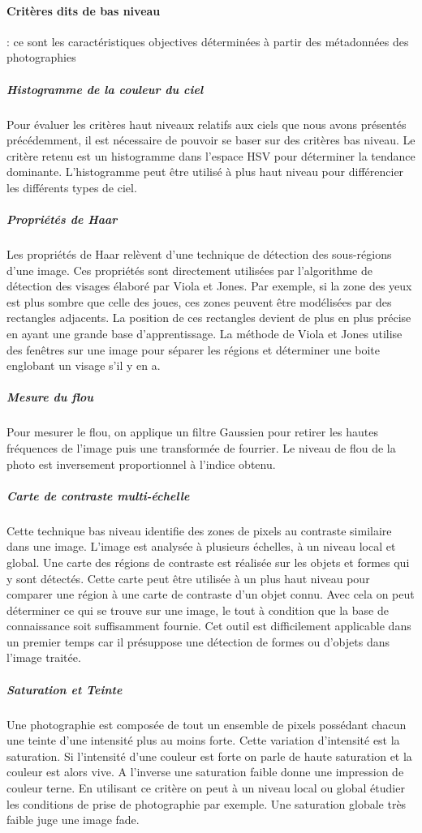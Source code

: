 \documentclass[11pt, french]{report-rd-info}
\begin{document}
\paragraph{Critères dits de bas niveau} : ce sont les caractéristiques objectives déterminées à partir des métadonnées des photographies
\subparagraph{Histogramme de la couleur du ciel}
Pour évaluer les critères haut niveaux relatifs aux ciels que nous avons présentés précédemment, il est nécessaire de pouvoir se baser sur des critères bas niveau. Le critère retenu est un histogramme dans l’espace HSV pour déterminer la tendance dominante. L’histogramme peut être utilisé à plus haut niveau pour différencier les différents types de ciel.
\subparagraph{Propriétés de Haar}
Les propriétés de Haar relèvent d’une technique de détection des sous-régions d’une image. Ces propriétés sont directement utilisées par l’algorithme de détection des visages élaboré par Viola et Jones. Par exemple, si la zone des yeux est plus sombre que celle des joues, ces zones peuvent être modélisées par des rectangles adjacents. La position de ces rectangles devient de plus en plus précise en ayant une grande base d’apprentissage. La méthode de Viola et Jones utilise des fenêtres sur une image pour séparer les régions et déterminer une boite englobant un visage s’il y en a.


\subparagraph{Mesure du flou}
Pour mesurer le flou, on applique un filtre Gaussien pour retirer les hautes fréquences de l’image puis une transformée de fourrier. Le niveau de flou de la photo est inversement proportionnel à l’indice obtenu.


\subparagraph{Carte de contraste multi-échelle}
Cette technique bas niveau identifie des zones de pixels au contraste similaire dans une image. L’image est analysée à plusieurs échelles, à un niveau local et global. Une carte des régions de contraste est réalisée sur les objets et formes qui y sont détectés. Cette carte peut être utilisée à un plus haut niveau pour comparer une région à une carte de contraste d’un objet connu. Avec cela on peut déterminer ce qui se trouve sur une image, le tout à condition que la base de connaissance soit suffisamment fournie. Cet outil est difficilement applicable dans un premier temps car il présuppose une détection de formes ou d’objets dans l’image traitée. 


\subparagraph{Saturation et Teinte}
Une photographie est composée de tout un ensemble de pixels possédant chacun une teinte d’une intensité plus au moins forte. Cette variation d’intensité est la saturation. Si l’intensité d’une couleur est forte on parle de haute saturation et la couleur est alors vive. A l’inverse une saturation faible donne une impression de couleur terne. En utilisant ce critère on peut à un niveau local ou global étudier les conditions de prise de photographie par exemple. Une saturation globale très faible juge une image fade.
\end{document}
